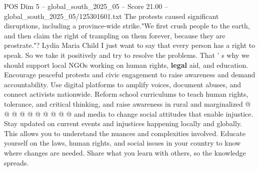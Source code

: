 \begin{textsample}{POS Dim 5 – global\_south\_2025\_05 – Score 21.00 – global\_south\_2025\_05/125301601.txt}
The protests caused significant disruptions, including a province-wide strike."We first crush people to the earth, and then claim the right of trampling on them forever, because they are prostrate."?
Lydia Maria Child I just want to say that every person has a right to speak.
So we take it positively and try to resolve the problems.
That ' s why we should support local NGOs working on human rights, \textbf{legal} aid, and education.
Encourage peaceful protests and civic engagement to raise awareness and demand accountability.
Use digital platforms to amplify voices, document abuses, and connect activists nationwide.
Reform school curriculums to teach human rights, tolerance, and critical thinking, and raise awareness in rural and marginalized @ @ @ @ @ @ @ @ @ @ and media to change social attitudes that enable injustice.
Stay updated on current events and injustices happening locally and globally.
This allows you to understand the nuances and complexities involved.
Educate yourself on the laws, human rights, and social issues in your country to know where changes are needed.
Share what you learn with others, so the knowledge spreads.

\end{textsample}
